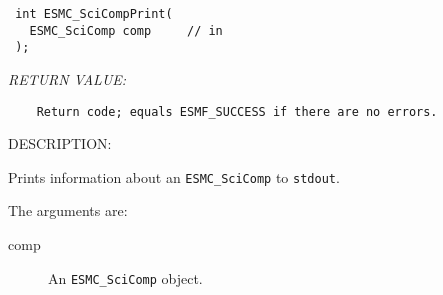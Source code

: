   
\begin{verbatim} int ESMC_SciCompPrint(
   ESMC_SciComp comp     // in
 );\end{verbatim}{\em RETURN VALUE:}
\begin{verbatim}    Return code; equals ESMF_SUCCESS if there are no errors.\end{verbatim}
{\sf DESCRIPTION:\\ }


  
    Prints information about an {\tt ESMC\_SciComp} to {\tt stdout}.
  
    The arguments are:
    \begin{description}
    \item[comp]
      An {\tt ESMC\_SciComp} object.
   \end{description}
  
\setlength{\parskip}{\oldparskip}
\setlength{\parindent}{\oldparindent}
\setlength{\baselineskip}{\oldbaselineskip}
